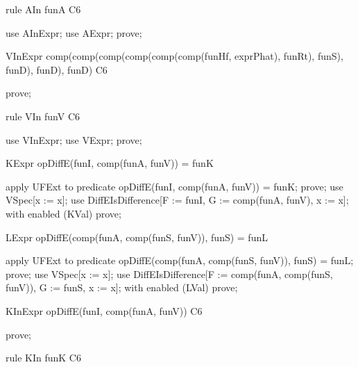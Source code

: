\documentclass{article}
\begin{document}
\begin{theorem}{rule AIn}
  funA \in C6
\end{theorem}

\begin{zproof}
use AInExpr;
use AExpr;
prove;
\end{zproof}
\begin{theorem}{VInExpr}
  comp(comp(comp(comp(comp(comp(funHf, exprPhat), funRt), funS), funD), funD), funD) \in C6
\end{theorem}

\begin{zproof}
prove;
\end{zproof}

\begin{theorem}{rule VIn}
  funV \in C6
\end{theorem}

\begin{zproof}
use VInExpr;
use VExpr;
prove;
\end{zproof}

\begin{theorem}{KExpr}
  opDiffE(funI, comp(funA, funV)) = funK
\end{theorem}

\begin{zproof}
apply UFExt to predicate opDiffE(funI, comp(funA, funV)) = funK;
prove;
use VSpec[x := x];
use DiffEIsDifference[F := funI, G := comp(funA, funV), x := x];
with enabled (KVal) prove;
\end{zproof}

\begin{theorem}{LExpr}
  opDiffE(comp(funA, comp(funS, funV)), funS) = funL
\end{theorem}

\begin{zproof}
apply UFExt to predicate opDiffE(comp(funA, comp(funS, funV)), funS) = funL;
prove;
use VSpec[x := x];
use DiffEIsDifference[F := comp(funA, comp(funS, funV)), G := funS, x := x];
with enabled (LVal) prove;
\end{zproof}

\begin{theorem}{KInExpr}
  opDiffE(funI, comp(funA, funV)) \in C6
\end{theorem}

\begin{zproof}
prove;
\end{zproof}

\begin{theorem}{rule KIn}
  funK \in C6
\end{theorem}
\end{document}
